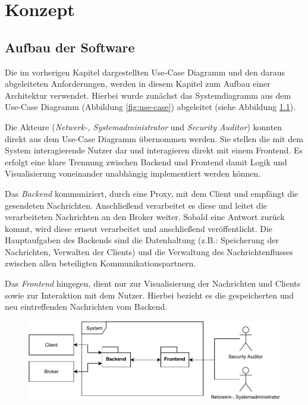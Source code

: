 \chapter{Konzept}
\section{Aufbau der Software}
    Die im vorherigen Kapitel dargestellten Use-Case Diagramm und den daraus abgeleiteten Anforderungen, werden in diesem Kapitel zum Aufbau einer Architektur verwendet.
    Hierbei wurde zunächst das Systemdiagramm aus dem Use-Case Diagramm (Abbildung \ref{fig:use-case}) abgeleitet (siehe Abbildung \ref{fig:system_all}).
    
    Die Akteure (\emph{Netwerk-, Systemadministrator} und \emph{Security Auditor}) konnten direkt aus dem Use-Case Diagramm übernommen werden.
    Sie stellen die mit dem System interagierende Nutzer dar und interagieren direkt mit einem Frontend.
    Es erfolgt eine klare Trennung zwischen Backend und Frontend damit Logik und Visualisierung voneinander unabhängig implementiert werden können.
    
    Das \emph{Backend} kommuniziert, durch eine Proxy, mit dem Client und empfängt die gesendeten Nachrichten. Anschließend verarbeitet es diese und leitet die verarbeiteten Nachrichten an den Broker weiter. Sobald eine Antwort zurück kommt, wird diese erneut verarbeitet und anschließend veröffentlicht.
    Die Hauptaufgaben des Backends sind die Datenhaltung (z.B.: Speicherung der Nachrichten, Verwalten der Clients) und die Verwaltung des Nachrichtenflusses zwischen allen beteiligten Kommunikationspartnern.
    
    Das \emph{Frontend} hingegen, dient nur zur Visualisierung der Nachrichten und Clients sowie zur Interaktion mit dem Nutzer. Hierbei bezieht es die gespeicherten und neu eintreffenden Nachrichten vom Backend.
    \begin{figure}[h]%
        \centering
        \includegraphics[width=14cm]{tex/bilder/4_konzept/Systemdiagram.pdf}
        \label{fig:system_all}
    \end{figure}
    
